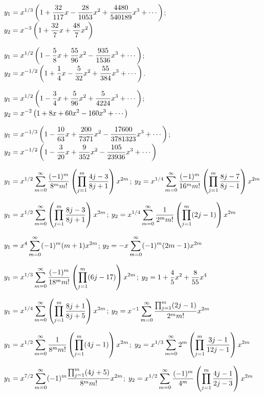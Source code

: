 $y_{1}=\displaystyle{x^{1/3}\left(1+\frac{32}{117}x-\frac{28}{1053}x^{2}+
\frac{4480}{540189}x^{3}+\cdots\right)}$;    \,
$y_{2}=\displaystyle{x^{-3}\left(1+\frac{32}{7}x+\frac{48}{7}x^{2}\right)}$

$y_{1}=\displaystyle{x^{1/2}\left(1-\frac{5}{8}x+\frac{55}{96}x^{2}
-\frac{935}{1536}x^{3}+\cdots\right)}$;    \,
$y_{2}=\displaystyle{x^{-1/2}\left(1+\frac{1}{4}x-\frac{5}{32}x^{2}
+\frac{55}{384}x^{3}+\cdots\right)}$.

$y_{1}=\displaystyle{x^{1/2}\left(1-\frac{3}{4}x+\frac{5}{96}x^{2}+\frac{5}{4224}x^{3}
+\cdots\right)}$;    \,
$y_{2}=\displaystyle{x^{-2}\left(1+8x+60x^{2}-160x^{3}+\cdots\right)}$

$y_{1}=\displaystyle{x^{-1/3}\left(1-\frac{10}{63}x+\frac{200}{7371}x^{2}-
\frac{17600}{3781323}x^{3}
+\cdots\right)}$;    \,
$y_{2}=\displaystyle{x^{-1/2}\left(1-\frac{3}{20}x+\frac{9}{352}x^{2}
-\frac{105}{23936}x^{3}
+\cdots\right)}$

$y_{1}=\displaystyle{x^{1/2}\sum_{m=0}^{\infty}\frac{(-1)^{m}}{8^{m}m!}\left(\prod_{j=1}^{m}\frac{4j-3}{8j+1}\right)x^{2m}}$;
$y_{2}=\displaystyle{x^{1/4}\sum_{m=0}^{\infty}\frac{(-1)^{m}}{16^{m}m!}\left(\prod_{j=1}^{m}\frac{8j-7}{8j-1}\right)x^{2m}}$

$y_{1}=\displaystyle{x^{1/2}\sum_{m=0}^{\infty}\left(\prod_{j=1}^{m}\frac{8j-3}{8j+
1}\right)
x^{2m}}$;
$y_{2}=\displaystyle{x^{1/4}\sum_{m=0}^{\infty}\frac{1}{2^{m}m!}\left(\prod_{j=1}^{m}(2j-1)
\right)x^{2m}}$

$y_{1}=\displaystyle{x^{4}\sum_{m=0}^{\infty}(-1)^{m}(m+1)x^{2m}}$;
$y_{2}=-\displaystyle{x\sum_{m=0}^{\infty}(-1)^{m}(2m-1)x^{2m}}$

$y_{1}=\displaystyle{x^{1/3}\sum_{m=0}^{\infty}\frac{(-1)^{m}}{18^{m}m!}\left(\prod_{j=1}^{m}
(6j-17)\right)x^{2m}}$;
$y_{2}=\displaystyle{1+\frac{4}{5}x^{2}+\frac{8}{55}x^{4}}$

$y_{1}=\displaystyle{x^{1/4}\sum_{m=0}^{\infty}\left(\prod_{j=1}^{m}\frac{8j+1}{8j+5}
\right)x^{2m}}$;
$y_{2}=\displaystyle{x^{-1}\sum_{m=0}^{\infty}\frac{\prod_{j=1}^{m}(2j-1)}{2^{m}m!}
x^{2m}}$

$y_{1}=\displaystyle{x^{1/2}\sum_{m=0}^{\infty}\frac{1}{8^{m}m!}\left(\prod_{j=1}^{m}(4j-1)
\right)x^{2m}}$;
$y_{2}=\displaystyle{x^{1/3}\sum_{m=0}^{\infty}2^{m}\left(\prod_{j=1}^{m}\frac{3j-1}{12j-1}
\right)x^{2m}}$

$y_{1}=\displaystyle{x^{7/2}\sum_{m=0}^{\infty}(-1)^{m}\frac{\prod_{j=1}^{m}(4j+5)}{8^{m}m!}x^{2m}}$;
$y_{2}=\displaystyle{x^{1/2}\sum_{m=0}^{\infty}\frac{(-1)^{m}}{4^{m}}\left(\prod_{j=1}^{m}
\frac{4j-1}{2j-3}
\right)x^{2m}}$

